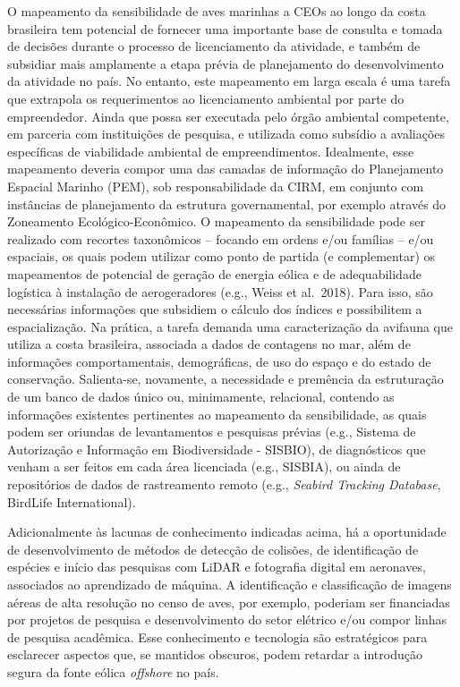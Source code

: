 \documentclass[
  oneside]{scrbook}
\begin{document}
O mapeamento da sensibilidade de aves marinhas a CEOs ao longo da costa brasileira tem potencial de fornecer uma importante base de consulta e tomada de decisões durante o processo de licenciamento da atividade, e também de subsidiar mais amplamente a etapa prévia de planejamento do desenvolvimento da atividade no país. No entanto, este mapeamento em larga escala é uma tarefa que extrapola os requerimentos ao licenciamento ambiental por parte do empreendedor. Ainda que possa ser executada pelo órgão ambiental competente, em parceria com instituições de pesquisa, e utilizada como subsídio a avaliações específicas de viabilidade ambiental de empreendimentos. Idealmente, esse mapeamento deveria compor uma das camadas de informação do Planejamento Espacial Marinho (PEM), sob responsabilidade da CIRM, em conjunto com instâncias de planejamento da estrutura governamental, por exemplo através do Zoneamento Ecológico-Econômico. O mapeamento da sensibilidade pode ser realizado com recortes taxonômicos -- focando em ordens e/ou famílias -- e/ou espaciais, os quais podem utilizar como ponto de partida (e complementar) os mapeamentos de potencial de geração de energia eólica e de adequabilidade logística à instalação de aerogeradores (e.g., Weiss et al.~2018). Para isso, são necessárias informações que subsidiem o cálculo dos índices e possibilitem a espacialização. Na prática, a tarefa demanda uma caracterização da avifauna que utiliza a costa brasileira, associada a dados de contagens no mar, além de informações comportamentais, demográficas, de uso do espaço e do estado de conservação. Salienta-se, novamente, a necessidade e premência da estruturação de um banco de dados único ou, minimamente, relacional, contendo as informações existentes pertinentes ao mapeamento da sensibilidade, as quais podem ser oriundas de levantamentos e pesquisas prévias (e.g., Sistema de Autorização e Informação em Biodiversidade - SISBIO), de diagnósticos que venham a ser feitos em cada área licenciada (e.g., SISBIA), ou ainda de repositórios de dados de rastreamento remoto (e.g., \emph{Seabird Tracking Database}, BirdLife International).

Adicionalmente às lacunas de conhecimento indicadas acima, há a oportunidade de desenvolvimento de métodos de detecção de colisões, de identificação de espécies e início das pesquisas com LiDAR e fotografia digital em aeronaves, associados ao aprendizado de máquina. A identificação e classificação de imagens aéreas de alta resolução no censo de aves, por exemplo, poderiam ser financiadas por projetos de pesquisa e desenvolvimento do setor elétrico e/ou compor linhas de pesquisa acadêmica. Esse conhecimento e tecnologia são estratégicos para esclarecer aspectos que, se mantidos obscuros, podem retardar a introdução segura da fonte eólica \emph{offshore} no país.
\end{document}
